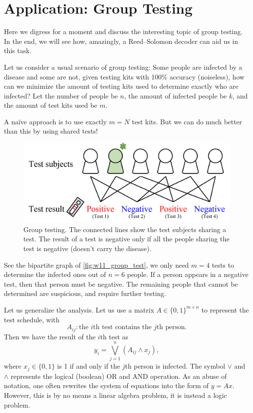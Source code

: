 \section{Application: Group Testing} \label{sec:w11_GT}
Here we digress for a moment and discuss the interesting topic of group testing. In the end, we will see how, amazingly, a Reed--Solomon decoder can aid us in this task.

Let us consider a usual scenario of group testing: Some people are infected by a disease and some are not, given testing kits with 100\% accuracy (noiseless), how can we minimize the amount of testing kits used to determine exactly who are infected? Let the number of people be $n$, the amount of infected people be $k$, and the amount of test kits used be $m$.

A na\"ive approach is to use exactly $m=N$ test kits. But we can do much better than this by using shared tests!

\begin{figure}[H]
    \centering
    \includegraphics[width=0.6\linewidth]{figures/w11_group_test.png}
    \caption{Group testing. The connected lines show the test subjects sharing a test. The result of a test is negative only if all the people sharing the test is negative (doesn't carry the disease).}
    \label{fig:w11_group_test}
\end{figure}

See the bipartite graph of \autoref{fig:w11_group_test}, we only need $m=4$ tests to determine the infected ones out of $n=6$ people. If a person appears in a negative test, then that person must be negative. The remaining people that cannot be determined are suspicious, and require further testing.

Let us generalize the analysis. Let us use a matrix $A\in\{0,1\}^{m\times n}$ to represent the test schedule, with
\begin{equation}
    A_{ij}:\text{the $i$th test contains the $j$th person.}
\end{equation}
Then we have the result of the $i$th test as
\begin{equation}
    y_i = \bigvee_{j=1}^n (A_{ij} \wedge x_j),
\end{equation}
where $x_j\in\{0,1\}$ is 1 if and only if the $j$th person is infected. The symbol $\vee$ and $\wedge$ represents the logical (boolean) OR and AND operation. As an abuse of notation, one often rewrites the system of equations into the form of $y=Ax$. However, this is by no means a linear algebra problem, it is instead a logic problem.

